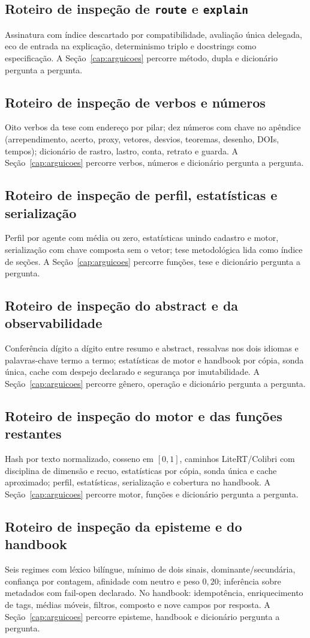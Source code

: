 \subsection{Roteiro de inspeção de \texttt{route} e \texttt{explain}}
Assinatura com índice descartado por compatibilidade, avaliação única delegada, eco de entrada na explicação, determinismo triplo e docstrings como especificação. A Seção~\ref{cap:arguicoes} percorre método, dupla e dicionário pergunta a pergunta.
\subsection{Roteiro de inspeção de verbos e números}
Oito verbos da tese com endereço por pilar; dez números com chave no apêndice (arrependimento, acerto, proxy, vetores, desvios, teoremas, desenho, DOIs, tempos); dicionário de rastro, lastro, conta, retrato e guarda. A Seção~\ref{cap:arguicoes} percorre verbos, números e dicionário pergunta a pergunta.
\subsection{Roteiro de inspeção de perfil, estatísticas e serialização}
Perfil por agente com média ou zero, estatísticas unindo cadastro e motor, serialização com chave composta sem o vetor; tese metodológica lida como índice de seções. A Seção~\ref{cap:arguicoes} percorre funções, tese e dicionário pergunta a pergunta.
\subsection{Roteiro de inspeção do abstract e da observabilidade}
Conferência dígito a dígito entre resumo e abstract, ressalvas nos dois idiomas e palavras-chave termo a termo; estatísticas de motor e handbook por cópia, sonda única, cache com despejo declarado e segurança por imutabilidade. A Seção~\ref{cap:arguicoes} percorre gênero, operação e dicionário pergunta a pergunta.
\subsection{Roteiro de inspeção do motor e das funções restantes}
Hash por texto normalizado, cosseno em $[0,1]$, caminhos LiteRT/Colibri com disciplina de dimensão e recuo, estatísticas por cópia, sonda única e cache aproximado; perfil, estatísticas, serialização e cobertura no handbook. A Seção~\ref{cap:arguicoes} percorre motor, funções e dicionário pergunta a pergunta.
\subsection{Roteiro de inspeção da episteme e do handbook}
Seis regimes com léxico bilíngue, mínimo de dois sinais, dominante/secundária, confiança por contagem, afinidade com neutro e peso $0{,}20$; inferência sobre metadados com fail-open declarado. No handbook: idempotência, enriquecimento de tags, médias móveis, filtros, composto e nove campos por resposta. A Seção~\ref{cap:arguicoes} percorre episteme, handbook e dicionário pergunta a pergunta.
